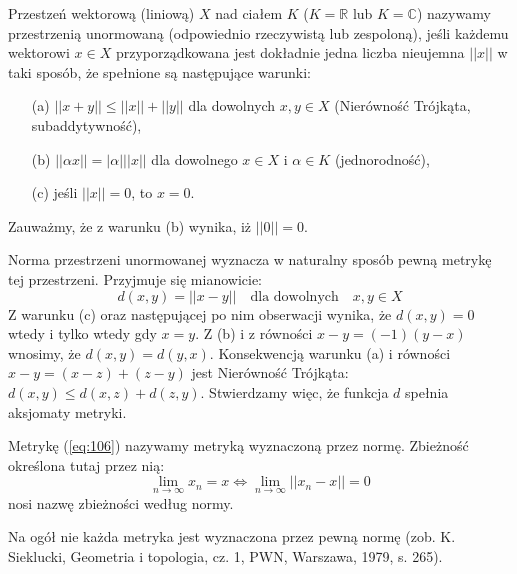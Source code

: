 \documentclass[leqno]{article}
\begin{document}
\begin{justify}
\begin{defn}
    Przestzeń wektorową (liniową) $X$ nad ciałem $K$ ($K = \mathbb{R}$ lub $K = \mathbb{C}$)
    nazywamy przestrzenią unormowaną (odpowiednio rzeczywistą lub zespoloną), jeśli 
    każdemu wektorowi $x \in X$ przyporządkowana jest dokładnie jedna liczba nieujemna $||x||$ w taki sposób, że spełnione są następujące warunki:
    \begin{itemize}
        \item [(a)]
            $||x + y|| \leqslant ||x|| + ||y||$ dla dowolnych $x, y \in X$ (Nierówność Trójkąta, subaddytywność),
        \item [(b)]
            $||\alpha x|| = |\alpha| ||x||$ dla dowolnego $x \in X$ i $\alpha \in K$ (jednorodność),
        \item [(c)]
            jeśli $||x|| = 0$, to $x = 0$.
    \end{itemize}

    Zauważmy, że z warunku (b) wynika, iż $||0|| = 0$.
\end{defn}

\begin{uwaga}
    Norma przestrzeni unormowanej wyznacza w naturalny sposób pewną metrykę tej przestrzeni. Przyjmuje się mianowicie:
    \begin{equation}\label{eq:106}
        d(x, y) = ||x - y|| \quad \text{dla dowolnych} \quad x, y \in X
    \end{equation}
    Z warunku (c) oraz następującej po nim obserwacji wynika, że $d(x, y) = 0$ wtedy i tylko wtedy gdy $x = y$. 
    Z (b) i z równości $x - y = (-1)(y-x)$ wnosimy, że $d(x, y) = d(y, x)$. Konsekwencją warunku (a) i równości 
    $x - y = (x - z) + (z - y)$ jest Nierówność Trójkąta: $d(x, y) \leqslant d(x, z) + d(z, y)$.
    Stwierdzamy więc, że funkcja $d$ spełnia aksjomaty metryki.
\end{uwaga}

\begin{defn}
    Metrykę (\ref{eq:106}) nazywamy metryką wyznaczoną przez normę. Zbieżność określona tutaj przez nią:
    \[
        \lim_{n \to \infty}x_n = x \iff \lim_{n \to \infty}||x_n - x|| = 0
    \]
    nosi nazwę zbieżności według normy.
\end{defn}

\begin{uwaga}
    Na ogół nie każda metryka jest wyznaczona przez pewną normę (zob. K. Sieklucki, Geometria i topologia, cz. 1, PWN, 
    Warszawa, 1979, s. 265).
\end{uwaga}


\end{justify}
\end{document}
